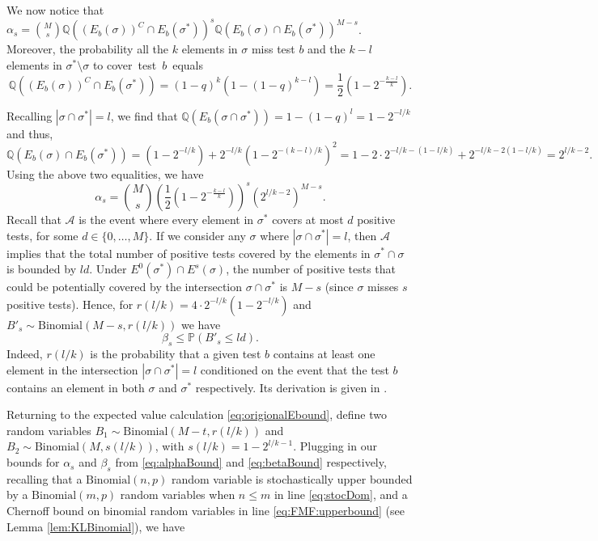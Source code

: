 \documentclass[12pt,reqno]{amsart}
\numberwithin{equation}{section}
\theoremstyle{definition}
\newcommand{\Q}{\mathbb{Q}}
\renewcommand{\P}{\mathbb{P}}
\newcommand{\Bi}[1]{\ensuremath{\text{Binomial}\left(#1\right)}}
\renewcommand{\[}{\begin{equation}}
\renewcommand{\]}{\end{equation}}
\newcommand{\scr}{\mathcal}
\renewcommand{\|}{\bigg{|}}
\begin{document}
We now notice that $\alpha_s = \binom{M}{s}\Q((E_b(\sigma))^C \cap E_b(\sigma^*))^s\Q(E_b(\sigma) \cap E_b(\sigma^*))^{M-s}$. Moreover, the probability all the $k$ elements in $\sigma$ miss test $b$ and the $k-l$ elements in $\sigma^* \setminus \sigma$ to cover~test~$b$~equals
\[
	 \Q((E_b(\sigma))^C \cap E_b(\sigma^*)) = (1-q)^k(1-(1-q)^{k-l}) = \frac{1}{2}\left(1-2^{-\frac{k-l}{k}}\right).\label{eq:probcalc}
\]

Recalling $|\sigma \cap \sigma^*| = l$, we find that $\Q(E_b(\sigma \cap \sigma^*)) = 1- (1-q)^l= 1-2^{-l/k}$ and thus,
\[
    \Q(E_b(\sigma) \cap E_b(\sigma^*)) = (1-2^{-l/k}) + 2^{-l/k}(1-2^{-(k-l)/k})^2= 1-2\cdot 2^{-l/k - (1-l/k)} + 2^{-l/k - 2(1-l/k)} = 2^{l/k - 2}.
\]
Using the above two equalities, we have
\[
    \alpha_s = \binom{M}{s} \left(\frac{1}{2}\left(1-2^{-\frac{k-l}{k}}\right)\right)^s \left(2^{l/k - 2}\right)^{M-s}.\label{eq:alphaBound}
\]
Recall that $\scr{A}$ is the event where every element in $\sigma^*$ covers at most $d$ positive tests, for some $d \in \{0, \dots, M\}$.
If we consider any $\sigma$ where $|\sigma \cap \sigma^*| = l$, then $\scr{A}$ implies that the total number of positive tests covered by the elements in $\sigma^* \cap \sigma$ is bounded by $ld$.
Under $E^0(\sigma^*) \cap E^s(\sigma)$, the number of positive tests that could be potentially covered by the intersection $\sigma \cap \sigma^*$ is $M-s$ (since $\sigma$ misses $s$ positive tests). Hence, for $r(l/k) = 4 \cdot 2^{-l/k}(1-2^{-l/k})$ and $B'_s \sim \text{Binomial}(M-s, r(l/k))$ we have
\[\beta_s \leq \P(B'_s \leq ld).\label{eq:betaBound}\]
Indeed, $r(l/k)$ is the probability that a given test $b$ contains at least one element in the intersection $|\sigma \cap \sigma^*| = l$ conditioned on the event that the test $b$ contains an element in both $\sigma$ and $\sigma^*$ respectively. Its derivation is given in \cite[Section 9.2.2 (Arxiv version)]{cojaoghlan2022statistical}.

Returning to the expected value calculation \eqref{eq:origionalEbound}, define two random variables $B_1\sim\text{Binomial}(M-t,r(l/k))$ and $B_2 \sim \text{Binomial}(M,s(l/k))$, with $s(l/k) = 1-2^{l/k-1}$. Plugging in our bounds for $\alpha_s$ and $\beta_s$ from \eqref{eq:alphaBound} and \eqref{eq:betaBound} respectively, recalling that a $\Bi{n,p}$ random variable is stochastically upper bounded by a $\Bi{m,p}$ random variables when $n \leq m$ in line \eqref{eq:stocDom}, and a Chernoff bound on binomial random variables in line \eqref{eq:FMF:upperbound} (see Lemma \ref{lem:KLBinomial}), we have
\end{document}
